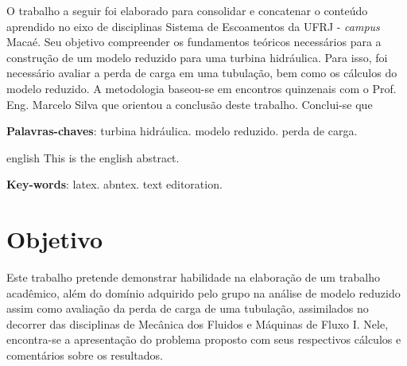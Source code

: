 \documentclass[a4paper, 12pt, openany, oneside, brazil]{abntex2} %
\begin{document}
\frenchspacing

\imprimircapa

\imprimirfolhaderosto


\setlength{\absparsep}{18pt} %
\begin{resumo}

    O trabalho a seguir foi elaborado para consolidar e concatenar o conteúdo aprendido no eixo de disciplinas Sistema de Escoamentos da UFRJ - \textit{campus} Macaé. Seu objetivo compreender os fundamentos teóricos necessários para a construção de um modelo reduzido para uma turbina hidráulica. Para isso, foi necessário avaliar a perda de carga em uma tubulação, bem como os cálculos do modelo reduzido. A metodologia baseou-se em encontros quinzenais com o Prof. Eng. Marcelo Silva que orientou a conclusão deste trabalho. Conclui-se que 

 \textbf{Palavras-chaves}: turbina hidráulica. modelo reduzido. perda de carga.

\end{resumo}

\begin{resumo}[Abstract]
 \begin{otherlanguage*}{english}
   This is the english abstract.

   \vspace{\onelineskip}

   \noindent
   \textbf{Key-words}: latex. abntex. text editoration.
 \end{otherlanguage*}
\end{resumo}

\tableofcontents
\cleardoublepage

\textual

\OnehalfSpacing

\chapter*[Objetivo]{Objetivo}
    Este trabalho pretende demonstrar habilidade na elaboração de um trabalho acadêmico, além do domínio adquirido pelo grupo na análise de modelo reduzido assim como avaliação da perda de carga de uma tubulação, assimilados no decorrer das disciplinas de Mecânica dos Fluidos e Máquinas de Fluxo I. Nele, encontra-se a apresentação do problema proposto com seus respectivos cálculos e comentários sobre os resultados.
\end{document}
